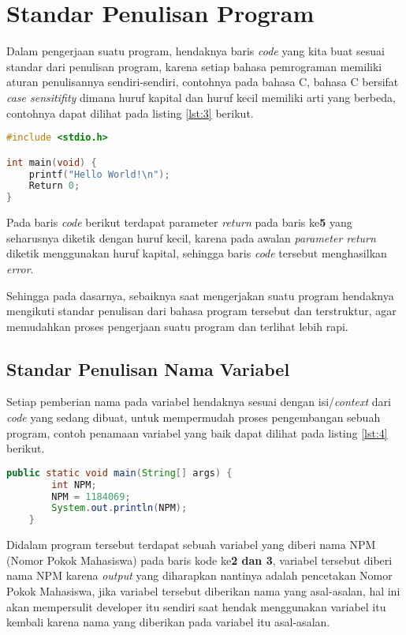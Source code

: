 \chapter{Standar Penulisan Program}

\par 
Dalam pengerjaan suatu program, hendaknya baris \textit{code} yang kita buat sesuai standar dari penulisan program, karena setiap bahasa pemrograman memiliki aturan penulisannya sendiri-sendiri, contohnya pada bahasa C, bahasa C bersifat \textit{case sensitifity} dimana huruf kapital dan huruf kecil memiliki arti yang berbeda, contohnya dapat dilihat pada listing \ref{lst:3} berikut.

\begin{lstlisting}[language=C,caption=Contoh Penulisan Parameter,label={lst:3}]
#include <stdio.h>

int main(void) {
    printf("Hello World!\n");
    Return 0;
}
\end{lstlisting}

\par 
Pada baris \textit{code} berikut terdapat parameter \textit{return} pada baris ke\textbf{5} yang seharusnya diketik dengan huruf kecil, karena pada awalan \textit{parameter return} diketik menggunakan huruf kapital, sehingga baris \textit{code} tersebut menghasilkan \textit{error}.
\par 
Sehingga pada dasarnya, sebaiknya saat mengerjakan suatu program hendaknya mengikuti standar penulisan dari bahasa program tersebut dan terstruktur, agar memudahkan proses pengerjaan suatu program dan terlihat lebih rapi.

\section{Standar Penulisan Nama Variabel}
\par 
Setiap pemberian nama pada variabel hendaknya sesuai dengan isi/\textit{context} dari \textit{code} yang sedang dibuat, untuk mempermudah proses pengembangan sebuah program, contoh penamaan variabel yang baik  dapat dilihat pada listing \ref{lst:4} berikut.

\begin{lstlisting}[language=Java, caption=Contoh standar penulisan variabel,label={lst:4}]
	public static void main(String[] args) {	
		int NPM;		
		NPM = 1184069;
		System.out.println(NPM);
	}
\end{lstlisting}

\par 
Didalam program tersebut terdapat sebuah variabel yang diberi nama NPM (Nomor Pokok Mahasiswa) pada baris kode ke\textbf{2 dan 3}, variabel tersebut diberi nama NPM karena \textit{output} yang diharapkan nantinya adalah pencetakan Nomor Pokok Mahasiswa, jika variabel tersebut diberikan nama yang asal-asalan, hal ini akan mempersulit developer itu sendiri saat hendak menggunakan variabel itu kembali karena nama yang diberikan pada variabel itu asal-asalan.


